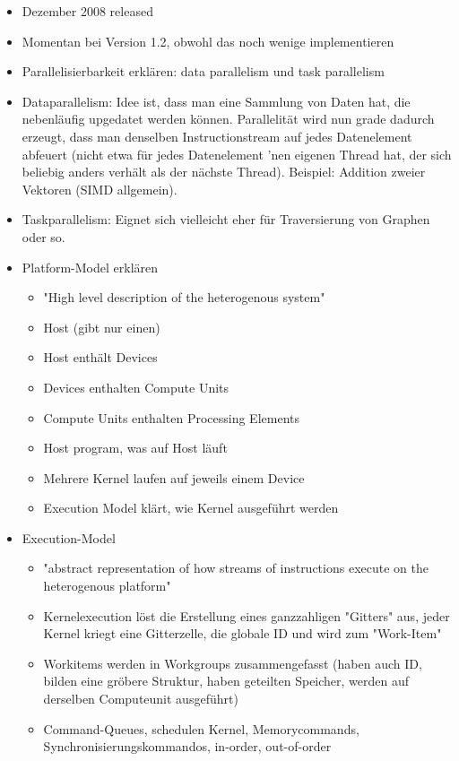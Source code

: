 \begin{itemize}
\item Dezember 2008 released
\item Momentan bei Version 1.2, obwohl das noch wenige implementieren
\item Parallelisierbarkeit erklären: data parallelism und task parallelism
\item Dataparallelism: Idee ist, dass man eine Sammlung von Daten hat, die
nebenläufig upgedatet werden können. Parallelität wird nun grade dadurch
erzeugt, dass man denselben Instructionstream auf jedes Datenelement abfeuert
(nicht etwa für jedes Datenelement 'nen eigenen Thread hat, der sich beliebig
anders verhält als der nächste Thread). Beispiel: Addition zweier Vektoren
(SIMD allgemein).
\item Taskparallelism: Eignet sich vielleicht eher für Traversierung von Graphen
oder so.
\item Platform-Model erklären
    \begin{itemize}
            \item "High level description of the heterogenous system"
            \item Host (gibt nur einen)
            \item Host enthält Devices
            \item Devices enthalten Compute Units
            \item Compute Units enthalten Processing Elements
            \item Host program, was auf Host läuft
            \item Mehrere Kernel laufen auf jeweils einem Device
            \item Execution Model klärt, wie Kernel ausgeführt werden
    \end{itemize}
\item Execution-Model
    \begin{itemize}
            \item "abstract representation of how streams of instructions execute on the heterogenous platform"
            \item Kernelexecution löst die Erstellung eines ganzzahligen "Gitters" aus, jeder Kernel kriegt eine Gitterzelle, die globale ID und wird zum "Work-Item"
            \item Workitems werden in Workgroups zusammengefasst (haben auch ID, bilden eine gröbere Struktur, haben geteilten Speicher, werden auf derselben Computeunit ausgeführt)
            \item Command-Queues, schedulen Kernel, Memorycommands, Synchronisierungskommandos, in-order, out-of-order

\end{itemize}
\end{itemize}
